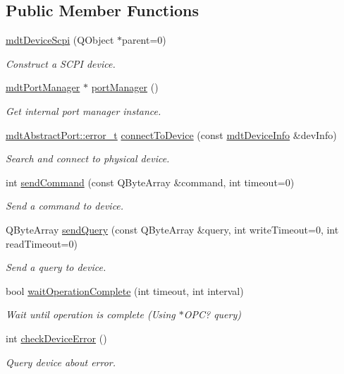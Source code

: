 \subsection*{Public Member Functions}
\begin{DoxyCompactItemize}
\item 
\hyperlink{classmdt_device_scpi_a44c03151a6796e5c1efd64ef55f2d14d}{mdtDeviceScpi} (QObject $\ast$parent=0)
\begin{DoxyCompactList}\small\item\em Construct a SCPI device. \end{DoxyCompactList}\item 
\hypertarget{classmdt_device_scpi_a7dc5ab8856a766a45bcc7e9cba0f54ca}{
\hyperlink{classmdt_port_manager}{mdtPortManager} $\ast$ \hyperlink{classmdt_device_scpi_a7dc5ab8856a766a45bcc7e9cba0f54ca}{portManager} ()}
\label{classmdt_device_scpi_a7dc5ab8856a766a45bcc7e9cba0f54ca}

\begin{DoxyCompactList}\small\item\em Get internal port manager instance. \end{DoxyCompactList}\item 
\hyperlink{classmdt_abstract_port_ad4121bb930c95887e77f8bafa065a85e}{mdtAbstractPort::error\_\-t} \hyperlink{classmdt_device_scpi_ae8e886b362cbf9d1bf7064b48348b8e8}{connectToDevice} (const \hyperlink{classmdt_device_info}{mdtDeviceInfo} \&devInfo)
\begin{DoxyCompactList}\small\item\em Search and connect to physical device. \end{DoxyCompactList}\item 
int \hyperlink{classmdt_device_scpi_ad104bd5814390c914e0a527d3e652fd2}{sendCommand} (const QByteArray \&command, int timeout=0)
\begin{DoxyCompactList}\small\item\em Send a command to device. \end{DoxyCompactList}\item 
QByteArray \hyperlink{classmdt_device_scpi_a9c15bed2ae92993f0378b59f15644bb2}{sendQuery} (const QByteArray \&query, int writeTimeout=0, int readTimeout=0)
\begin{DoxyCompactList}\small\item\em Send a query to device. \end{DoxyCompactList}\item 
bool \hyperlink{classmdt_device_scpi_aefd45e58d01aed9a165bb2c2dd98198c}{waitOperationComplete} (int timeout, int interval)
\begin{DoxyCompactList}\small\item\em Wait until operation is complete (Using $\ast$OPC? query) \end{DoxyCompactList}\item 
int \hyperlink{classmdt_device_scpi_a65c6f747ac6c6fe727a7359f78139168}{checkDeviceError} ()
\begin{DoxyCompactList}\small\item\em Query device about error. \end{DoxyCompactList}\end{DoxyCompactItemize}
